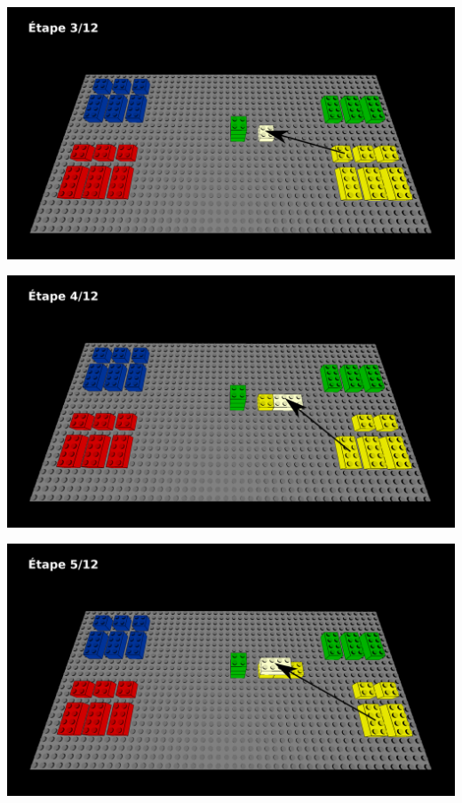 \documentclass[aspectratio=169]{beamer}
\begin{document}
\begin{frame}
  \includegraphics[width=\linewidth]{step3.png}
\end{frame}

\begin{frame}
  \includegraphics[width=\linewidth]{step4.png}
\end{frame}

\begin{frame}
  \includegraphics[width=\linewidth]{step5.png}
\end{frame}
\end{document}
